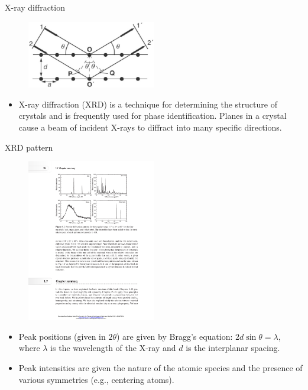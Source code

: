 \documentclass[aspectratio=169]{beamer}
\begin{document}
 \begin{frame}{X-ray diffraction}
 \begin{figure}
     \centering
     \includegraphics[width=0.5\textwidth]{figures/xrd.png}
 \end{figure}
    \begin{itemize}
        \item X-ray diffraction (XRD) is a technique for determining the structure of crystals and is frequently used for phase identification. Planes in a crystal cause a beam of incident X-rays to diffract into many specific directions.
    \end{itemize}
\end{frame}


\begin{frame}{XRD pattern}
\begin{figure}
    \centering
    \includegraphics[width=0.5\textwidth]{figures/xrd_patterns.pdf}
\end{figure}
\begin{itemize}
    \item Peak positions (given in $2\theta$) are given by Bragg's equation: $2d \sin{\theta} = \lambda$, where $\lambda$ is the wavelength of the X-ray and $d$ is the interplanar spacing.
    \item Peak intensities are given the nature of the atomic species and the presence of various symmetries (e.g., centering atoms).
\end{itemize}
\end{frame}
\end{document}
